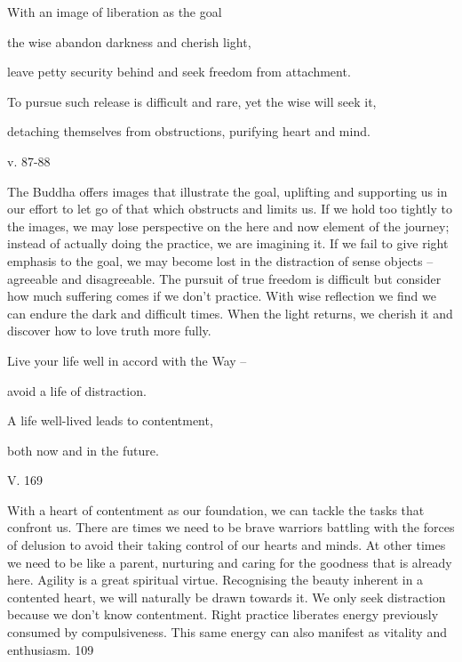 \documentclass[a4paper,portrait,12pt]{article}
\begin{document}
With an image of liberation as the goal 


the wise abandon darkness and cherish light,


leave petty security behind and seek freedom from attachment.


To pursue such release is difficult and rare, yet the wise will seek it, 


detaching themselves from obstructions, purifying heart and mind.





v. 87-88








The Buddha offers images that illustrate the goal, uplifting and supporting us in our effort to let go of that which obstructs and limits us. If we hold too tightly to the images, we may lose perspective on the here and now element of the journey; instead of actually doing the practice, we are imagining it. If we fail to give right emphasis to the goal, we may become lost in the distraction of sense objects -- agreeable and disagreeable. The pursuit of true freedom is difficult but consider how much suffering comes if we don't practice. With wise reflection we find we can endure the dark and difficult times. When the light returns, we cherish it and discover how to love truth more fully.














Live your life well in accord with the Way --


avoid a life of distraction.


A life well-lived leads to contentment,


both now and in the future.





V. 169





With a heart of contentment as our foundation, we can tackle the tasks that confront us. There are times we need to be brave warriors battling with the forces of delusion to avoid their taking control of our hearts and minds. At other times we need to be like a parent, nurturing and caring for the goodness that is already here. Agility is a great spiritual virtue. Recognising the beauty inherent in a contented heart, we will naturally be drawn towards it. We only seek distraction because we don't know contentment. Right practice liberates energy previously consumed by compulsiveness. This same energy can also manifest as vitality and enthusiasm. 109
\end{document}
